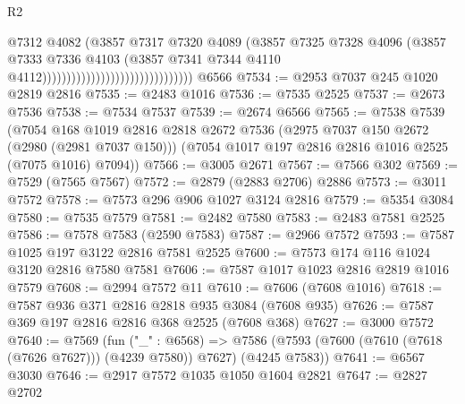 \begin{lexlean}{R2}
\begin{coremodule}
                                                          @7312
                                                          @4082
                                                          (@3857
                                                            @7317
                                                            @7320
                                                            @4089
                                                            (@3857
                                                              @7325
                                                              @7328
                                                              @4096
                                                              (@3857
                                                                @7333
                                                                @7336
                                                                @4103
                                                                (@3857
                                                                  @7341
                                                                  @7344
                                                                  @4110
                                                                  @4112)))))))))))))))))))))))))))))))
    @6566
@7534 := @2953 @7037 @245 @1020 @2819 @2816
@7535 := @2483 @1016
@7536 := @7535 @2525
@7537 := @2673 @7536
@7538 := @7534 @7537
@7539 := @2674 @6566
@7565 := @7538
    @7539
    (@7054
      @168
      @1019
      @2816
      @2818
      @2672
      @7536
      (@2975 @7037 @150 @2672 (@2980 (@2981 @7037 @150)))
      (@7054 @1017 @197 @2816 @2816 @1016 @2525 (@7075 @1016) @7094))
@7566 := @3005 @2671
@7567 := @7566 @302
@7569 := @7529 (@7565 @7567)
@7572 := @2879 (@2883 @2706) @2886
@7573 := @3011 @7572
@7578 := @7573 @296 @906 @1027 @3124 @2816
@7579 := @5354 @3084
@7580 := @7535 @7579
@7581 := @2482 @7580
@7583 := @2483 @7581 @2525
@7586 := @7578 @7583 (@2590 @7583)
@7587 := @2966 @7572
@7593 := @7587 @1025 @197 @3122 @2816 @7581 @2525
@7600 := @7573 @174 @116 @1024 @3120 @2816 @7580 @7581
@7606 := @7587 @1017 @1023 @2816 @2819 @1016 @7579
@7608 := @2994 @7572 @11
@7610 := @7606 (@7608 @1016)
@7618 := @7587 @936 @371 @2816 @2818 @935 @3084 (@7608 @935)
@7626 := @7587 @369 @197 @2816 @2816 @368 @2525 (@7608 @368)
@7627 := @3000 @7572
@7640 := @7569
    (fun ("_" : @6568) =>
    @7586 (@7593 (@7600 (@7610 (@7618 (@7626 @7627))) (@4239 @7580)) @7627) (@4245 @7583))
@7641 := @6567 @3030
@7646 := @2917 @7572 @1035 @1050 @1604 @2821
@7647 := @2827 @2702

\end{coremodule}
\end{lexlean}
